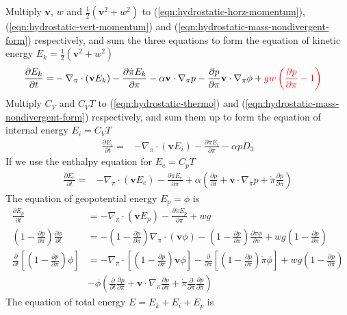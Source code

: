 \documentclass[12pt]{article}
\numberwithin{equation}{section}
\newcommand{\pd}[2]{\frac{\partial #1}{\partial #2}}
\newcommand{\pdt}[1]{\pd{#1}{t}}
\renewcommand{\vec}[1]{\mathbf{#1}}
\newcommand{\grad}[2][\pi]{\nabla_{#1} #2}
\renewcommand{\div}[2][\pi]{\nabla_{#1} \cdot #2}
\begin{document}
Multiply $\vec{v}$, $w$ and $\frac{1}{2} \left(\vec{v}^2 + w^2\right)$ to (\ref{eqn:hydrostatic-horz-momentum}), (\ref{eqn:hydrostatic-vert-momentum}) and (\ref{eqn:hydrostatic-mass-nondivergent-form}) respectively, and sum the three equations to form the equation of kinetic energy $E_k = \frac{1}{2} \left(\vec{v}^2 + w^2\right)$
\begin{align*}
  \pdt{E_k} = & - \div{\left(\vec{v} E_k\right)} - \pd{\dot{\pi} E_k}{\pi} - \alpha \vec{v} \cdot \grad{p} - \pd{p}{\pi} \vec{v} \cdot \grad{\phi} + {\color{red}g w \left(\pd{p}{\pi} - 1\right)}
\end{align*}
Multiply $C_V$ and $C_V T$ to (\ref{eqn:hydrostatic-thermo}) and (\ref{eqn:hydrostatic-mass-nondivergent-form}) respectively, and sum them up to form the equation of internal energy $E_i = C_V T$
\begin{align*}
  \pdt{E_i} = & - \div{\left(\vec{v} E_i\right)} - \pd{\dot{\pi} E_i}{\pi} - \alpha p D_3
\end{align*}
If we use the enthalpy equation for $E_e = C_p T$
\begin{align*}
  \pdt{E_e} = & - \div{\left(\vec{v} E_e\right)} - \pd{\dot{\pi} E_e}{\pi} + \alpha \left(\pdt{p} + \vec{v} \cdot \grad{p} + \dot{\pi} \pd{p}{\pi}\right)
\end{align*}
The equation of geopotential energy $E_p = \phi$ is
\begin{align*}
  \pdt{E_p} & = - \div{\left(\vec{v} E_p\right)} - \pd{\dot{\pi} E_p}{\pi} + w g \\
  \left(1 - \pd{p}{\pi}\right) \pdt{\phi} & = - \left(1 - \pd{p}{\pi}\right) \div{\left(\vec{v} \phi\right)} - \left(1 - \pd{p}{\pi}\right) \pd{\dot{\pi} \phi}{\pi} + w g \left(1 - \pd{p}{\pi}\right) \\
  \pdt{} \left[\left(1 - \pd{p}{\pi}\right) \phi\right] & = - \div{\left[\left(1 - \pd{p}{\pi}\right) \vec{v} \phi\right]} - \pd{}{\pi} \left[\left(1 - \pd{p}{\pi}\right) \dot{\pi} \phi\right] + w g \left(1 - \pd{p}{\pi}\right) \\
  & - \phi \left(\pdt{} \pd{p}{\pi} + \vec{v} \cdot \grad{\pd{p}{\pi}} + \dot{\pi} \pd{}{\pi} \pd{p}{\pi}\right)
\end{align*}
The equation of total energy $E = E_k + E_i + E_p$ is
\end{document}

